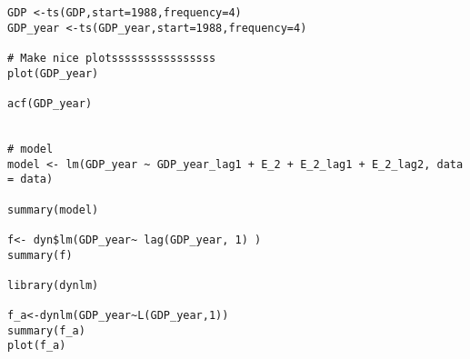 \begin{lstlisting}
GDP <-ts(GDP,start=1988,frequency=4)
GDP_year <-ts(GDP_year,start=1988,frequency=4)

# Make nice plotssssssssssssssss
plot(GDP_year)

acf(GDP_year)


# model
model <- lm(GDP_year ~ GDP_year_lag1 + E_2 + E_2_lag1 + E_2_lag2, data = data)

summary(model)

f<- dyn$lm(GDP_year~ lag(GDP_year, 1) )
summary(f)

library(dynlm)

f_a<-dynlm(GDP_year~L(GDP_year,1))
summary(f_a)
plot(f_a)






\end{lstlisting}